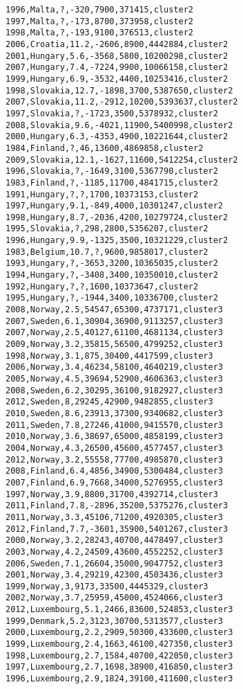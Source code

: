 \begin{lstlisting}[basicstyle=\footnotesize\ttfamily,numbers=none]
1996,Malta,?,-320,7900,371415,cluster2
1997,Malta,?,-173,8700,373958,cluster2
1998,Malta,?,-193,9100,376513,cluster2
2006,Croatia,11.2,-2606,8900,4442884,cluster2
2001,Hungary,5.6,-3568,5800,10200298,cluster2
2007,Hungary,7.4,-7224,9900,10066158,cluster2
1999,Hungary,6.9,-3532,4400,10253416,cluster2
1998,Slovakia,12.7,-1898,3700,5387650,cluster2
2007,Slovakia,11.2,-2912,10200,5393637,cluster2
1997,Slovakia,?,-1723,3500,5378932,cluster2
2008,Slovakia,9.6,-4021,11900,5400998,cluster2
2000,Hungary,6.3,-4353,4900,10221644,cluster2
1984,Finland,?,46,13600,4869858,cluster2
2009,Slovakia,12.1,-1627,11600,5412254,cluster2
1996,Slovakia,?,-1649,3100,5367790,cluster2
1983,Finland,?,-1185,11700,4841715,cluster2
1991,Hungary,?,?,1700,10373153,cluster2
1997,Hungary,9.1,-849,4000,10301247,cluster2
1998,Hungary,8.7,-2036,4200,10279724,cluster2
1995,Slovakia,?,298,2800,5356207,cluster2
1996,Hungary,9.9,-1325,3500,10321229,cluster2
1983,Belgium,10.7,?,9600,9858017,cluster2
1993,Hungary,?,-3653,3200,10365035,cluster2
1994,Hungary,?,-3408,3400,10350010,cluster2
1992,Hungary,?,?,1600,10373647,cluster2
1995,Hungary,?,-1944,3400,10336700,cluster2
2008,Norway,2.5,54547,65300,4737171,cluster3
2007,Sweden,6.1,30904,36900,9113257,cluster3
2007,Norway,2.5,40127,61100,4681134,cluster3
2009,Norway,3.2,35815,56500,4799252,cluster3
1998,Norway,3.1,875,30400,4417599,cluster3
2006,Norway,3.4,46234,58100,4640219,cluster3
2005,Norway,4.5,39694,52900,4606363,cluster3
2008,Sweden,6.2,30295,36100,9182927,cluster3
2012,Sweden,8,29245,42900,9482855,cluster3
2010,Sweden,8.6,23913,37300,9340682,cluster3
2011,Sweden,7.8,27246,41000,9415570,cluster3
2010,Norway,3.6,38697,65000,4858199,cluster3
2004,Norway,4.3,26500,45600,4577457,cluster3
2012,Norway,3.2,55558,77700,4985870,cluster3
2008,Finland,6.4,4856,34900,5300484,cluster3
2007,Finland,6.9,7668,34000,5276955,cluster3
1997,Norway,3.9,8800,31700,4392714,cluster3
2011,Finland,7.8,-2896,35200,5375276,cluster3
2011,Norway,3.3,45106,71200,4920305,cluster3
2012,Finland,7.7,-3601,35900,5401267,cluster3
2000,Norway,3.2,28243,40700,4478497,cluster3
2003,Norway,4.2,24509,43600,4552252,cluster3
2006,Sweden,7.1,26604,35000,9047752,cluster3
2001,Norway,3.4,29219,42300,4503436,cluster3
1999,Norway,3,9173,33500,4445329,cluster3
2002,Norway,3.7,25959,45000,4524066,cluster3
2012,Luxembourg,5.1,2466,83600,524853,cluster3
1999,Denmark,5.2,3123,30700,5313577,cluster3
2000,Luxembourg,2.2,2909,50300,433600,cluster3
1999,Luxembourg,2.4,1663,46100,427350,cluster3
1998,Luxembourg,2.7,1584,40700,422050,cluster3
1997,Luxembourg,2.7,1698,38900,416850,cluster3
1996,Luxembourg,2.9,1824,39100,411600,cluster3

\end{lstlisting}
